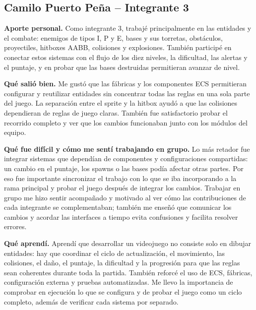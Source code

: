 \documentclass[12pt,letterpaper]{report}
\begin{document}
\subsection*{Camilo Puerto Peña -- Integrante 3}
\textbf{Aporte personal.} Como integrante 3, trabajé principalmente en las entidades y el combate: enemigos de tipos I, P y E, bases y sus torretas, obstáculos, proyectiles, hitboxes AABB, colisiones y explosiones. También participé en conectar estos sistemas con el flujo de los diez niveles, la dificultad, las alertas y el puntaje, y en probar que las bases destruidas permitieran avanzar de nivel.

\textbf{Qué salió bien.} Me gustó que las fábricas y los componentes ECS permitieran configurar y reutilizar entidades sin concentrar todas las reglas en una sola parte del juego. La separación entre el sprite y la hitbox ayudó a que las colisiones dependieran de reglas de juego claras. También fue satisfactorio probar el recorrido completo y ver que los cambios funcionaban junto con los módulos del equipo.

\textbf{Qué fue difícil y cómo me sentí trabajando en grupo.} Lo más retador fue integrar sistemas que dependían de componentes y configuraciones compartidas: un cambio en el puntaje, los spawns o las bases podía afectar otras partes. Por eso fue importante sincronizar el trabajo con lo que se iba incorporando a la rama principal y probar el juego después de integrar los cambios. Trabajar en grupo me hizo sentir acompañado y motivado al ver cómo las contribuciones de cada integrante se complementaban; también me enseñó que comunicar los cambios y acordar las interfaces a tiempo evita confusiones y facilita resolver errores.

\textbf{Qué aprendí.} Aprendí que desarrollar un videojuego no consiste solo en dibujar entidades: hay que coordinar el ciclo de actualización, el movimiento, las colisiones, el daño, el puntaje, la dificultad y la progresión para que las reglas sean coherentes durante toda la partida. También reforcé el uso de ECS, fábricas, configuración externa y pruebas automatizadas. Me llevo la importancia de comprobar en ejecución lo que se configura y de probar el juego como un ciclo completo, además de verificar cada sistema por separado.
\end{document}
